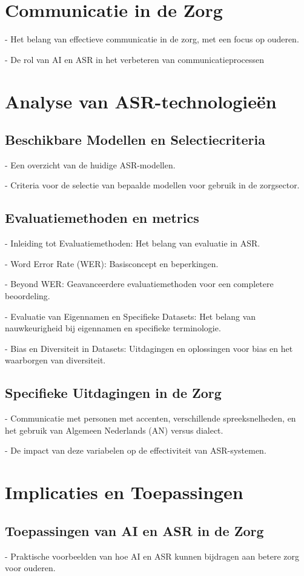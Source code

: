 \section{Communicatie in de Zorg}
   - Het belang van effectieve communicatie in de zorg, met een focus op ouderen. 

- De rol van AI en ASR in het verbeteren van communicatieprocessen
\section{Analyse van ASR-technologieën}
\subsection{Beschikbare Modellen en Selectiecriteria}
  - Een overzicht van de huidige ASR-modellen. 

- Criteria voor de selectie van bepaalde modellen voor gebruik in de zorgsector. 
\subsection{Evaluatiemethoden en metrics}
   - Inleiding tot Evaluatiemethoden: Het belang van evaluatie in ASR. 

- Word Error Rate (WER): Basisconcept en beperkingen. 

- Beyond WER: Geavanceerdere evaluatiemethoden voor een completere beoordeling. 

- Evaluatie van Eigennamen en Specifieke Datasets: Het belang van nauwkeurigheid bij eigennamen en specifieke terminologie. 

- Bias en Diversiteit in Datasets: Uitdagingen en oplossingen voor bias en het waarborgen van diversiteit.  
\subsection{Specifieke Uitdagingen in de Zorg}
   - Communicatie met personen met accenten, verschillende spreeksnelheden, en het gebruik van Algemeen Nederlands (AN) versus dialect. 

- De impact van deze variabelen op de effectiviteit van ASR-systemen. 



\section{Implicaties en Toepassingen}
 
\subsection{Toepassingen van AI en ASR in de Zorg}
- Praktische voorbeelden van hoe AI en ASR kunnen bijdragen aan betere zorg voor ouderen. 



